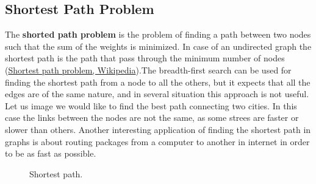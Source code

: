 \subsection{Shortest Path Problem}
The \textbf{shorted path problem} is the problem of finding a path between two nodes such that the sum of the weights is minimized. In case of an undirected graph the shortest path is the path that pass through the minimum number of nodes \cite{wikishortestpath} (\href{https://en.wikipedia.org/wiki/Shortest_path_problem}{Shortest path problem, Wikipedia}).The breadth-first search can be used for finding the shortest path from a node to all the others, but it expects that all the edges are of the same nature, and in several situation this approach is not useful. Let us image we would like to find the best path connecting two cities. In this case the links between the nodes are not the same, as some strees are faster or slower than others. Another interesting application of finding the shortest path in graphs is about routing packages from a computer to another in internet in order to be as fast as possible.

\begin{figure}[H]

\centering
{}

\caption[Shortest path.]{Shortest path.}
\label{graphs_11}
\end{figure}

